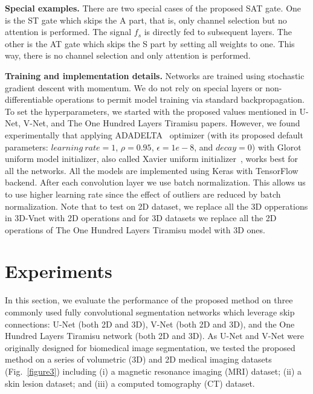 \documentclass{article}
\begin{document}
\noindent \textbf{Special examples.} There are two special cases of the proposed SAT gate. One is the ST gate which skips the A part, that is, only channel selection but no attention is performed. The signal $f_s$ is directly fed to subsequent layers. The other is the AT gate which skips the S part by setting all weights to one. This way, there is no channel selection and only attention is performed.

\noindent \textbf{Training and implementation details.} Networks are trained using stochastic gradient descent with momentum. We do not rely on special layers or non-differentiable operations to permit model training via standard backpropagation. To set the hyperparameters, we started with the proposed values mentioned in U-Net, V-Net, and The One Hundred Layers Tiramisu papers. However, we found experimentally that applying ADADELTA~\cite{zeiler2012adadelta} optimizer (with its proposed default parameters: $learning \ rate=1$, $\rho=0.95$, $\epsilon=1e-8$, and $decay=0$) with Glorot uniform model initializer, also called Xavier uniform initializer~\cite{glorot2010understanding}, works best for all the networks. All the models are implemented using Keras with TensorFlow backend. After each convolution layer we use batch normalization. This allows us to use higher learning rate since the effect of outliers are reduced by batch normalization. Note that to test on 2D dataset, we replace all the 3D opperations in 3D-Vnet with 2D operations and for 3D datasets we replace all the 2D operations of The One Hundred Layers Tiramisu model with 3D ones.


\section{Experiments}
In this section, we evaluate the performance of the proposed method on three commonly used fully convolutional segmentation networks which leverage skip connections: U-Net (both 2D and 3D), V-Net (both 2D and 3D), and the One Hundred Layers Tiramisu network (both 2D and 3D). As U-Net and V-Net were originally designed for biomedical image segmentation, we tested the proposed method on a series of volumetric (3D) and 2D medical imaging datasets (Fig.~\ref{figure3}) including (i) a magnetic resonance imaging (MRI) dataset; (ii) a skin lesion dataset; and (iii) a computed tomography (CT) dataset.
\end{document}
